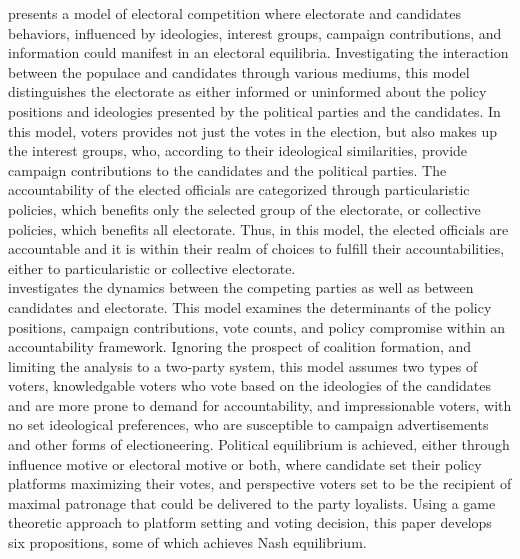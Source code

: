  presents a model of electoral competition where electorate and candidates behaviors, influenced by ideologies, interest groups, campaign contributions, and information could manifest in an electoral equilibria. Investigating the interaction between the populace and candidates through various mediums, this model distinguishes the electorate as either informed or uninformed about the policy positions and ideologies presented by the political parties and the candidates. In this model, voters provides not just the votes in the election, but also makes up the interest groups, who, according to their ideological similarities,  provide campaign contributions to the candidates and the political parties. The accountability of the elected officials are categorized through particularistic policies, which benefits only the selected group of the electorate, or collective policies, which benefits all electorate. Thus, in this model, the elected officials are accountable and it is within their realm of choices to fulfill their accountabilities, either to particularistic or collective electorate.\\
 investigates the dynamics between the competing parties as well as between candidates and electorate. This model examines the determinants of the policy positions, campaign contributions, vote counts, and policy compromise within an accountability framework. Ignoring the prospect of coalition formation, and limiting the analysis to a two-party system, this model assumes two types of voters, knowledgable voters who vote based on the ideologies of the candidates and are more prone to demand for accountability, and impressionable voters, with no set ideological preferences, who are susceptible to campaign advertisements and other forms of electioneering. Political equilibrium is achieved, either through influence motive or electoral motive or both, where candidate set their policy platforms maximizing their votes, and perspective voters set to be the recipient of maximal patronage that could be delivered to the party loyalists. Using a game theoretic approach to platform setting and voting decision, this paper develops six propositions, some of which achieves Nash equilibrium.\\
